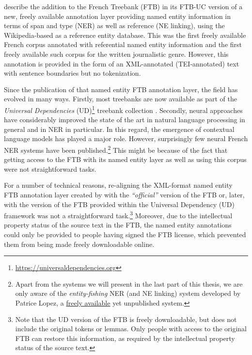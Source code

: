 \citet{sagot-etal-2012-annotation} describe the addition to the French Treebank (FTB) \citep{abeille-etal-2003-building} in its FTB-UC version \citep{candito-etal-2010-statistical} of a new, freely available annotation layer providing named entity information in terms of span and type (NER) as well as reference (NE linking), using the Wikipedia-based \aleda \cite{sagot-stern-2012-aleda} as a reference entity database. This was the first freely available French corpus annotated with referential named entity information and the first freely available such corpus for the written journalistic genre. However, this annotation is provided in the form of an XML-annotated (TEI-annotated) text with sentence boundaries but no tokenization.

Since the publication of that named entity FTB annotation layer, the field has evolved in many ways. Firstly, most treebanks are now available as part of the \emph{Universal Dependencies} (UD)\footnote{\url{https://universaldependencies.org}} treebank collection \citep{zeman-etal-2021-universal}. Secondly, neural approaches have considerably improved the state of the art in natural language processing in general and in NER in particular. In this regard, the emergence of contextual language models has played a major role. However, surprisingly few neural French NER systems have been published.\footnote{Apart from the systems we will present in the last part of this thesis, we are only aware of the \emph{entity-fishing} NER (and NE linking) system developed by Patrice Lopez, a \href{https://github.com/kermitt2/entity-fishing}{freely available} yet unpublished system.} This might be because of the fact that getting access to the FTB with its named entity layer as well as using this corpus were not straightforward tasks.

For a number of technical reasons, re-aligning the XML-format named entity FTB annotation layer created by \citet{sagot-etal-2012-annotation} with the \emph{``official''} version of the FTB or, later, with the version of the FTB provided within the Universal Dependency (UD) framework was not a straightforward task.\footnote{Note that the UD version of the FTB is freely downloadable, but does not include the original tokens or lemmas. Only people with access to the original FTB can restore this information, as required by the  intellectual property status of the source text.} Moreover, due to the intellectual property status of the source text in the FTB, the named entity annotations could only be provided to people having signed the FTB license, which prevented them from being made freely downloadable online.

